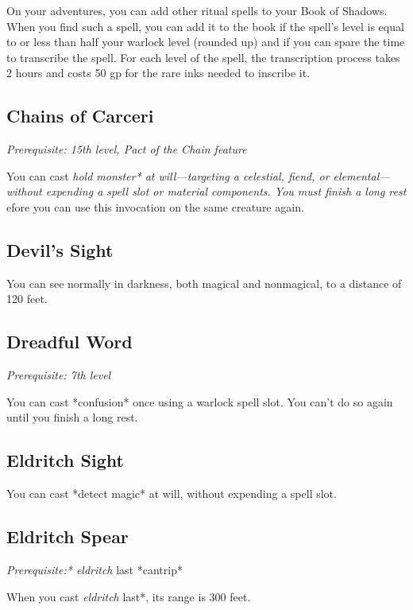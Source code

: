 On your adventures, you can add other ritual spells to your Book of Shadows. When you find such a spell, you can add it to the book if the spell’s level is equal to or less than half your warlock level (rounded up) and if you can spare the time to transcribe the spell. For each level of the spell, the transcription process takes 2 hours and costs 50 gp for the rare inks needed to inscribe it.

\subsection{Chains of Carceri}

\textit{Prerequisite: 15th level, Pact of the Chain feature}

You can cast \textit{hold monster* at will—targeting a celestial, fiend, or elemental—without expending a spell slot or material components. You must finish a long rest }efore you can use this invocation on the same creature again.

\subsection{Devil’s Sight}

You can see normally in darkness, both magical and nonmagical, to a distance of 120 feet.

\subsection{Dreadful Word}

\textit{Prerequisite: 7th level}

You can cast *confusion* once using a warlock spell slot. You can’t do so again until you finish a long rest.

\subsection{Eldritch Sight}

You can cast *detect magic* at will, without expending a spell slot.

\subsection{Eldritch Spear}

\textit{Prerequisite:* eldritch }last *cantrip*

When you cast \textit{eldritch }last*, its range is 300 feet.


